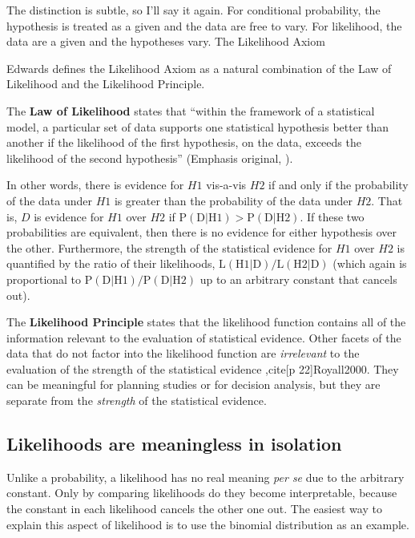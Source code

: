 The distinction is subtle, so I'll say it again. For conditional probability, the hypothesis is treated as a given and the data are free to vary. For likelihood, the data are a given and the hypotheses vary.
The Likelihood Axiom

Edwards \cite[p 30]{Edwards1992} defines the Likelihood Axiom as a natural combination of the Law of Likelihood and the Likelihood Principle.

The \textbf{Law of Likelihood} states that ``within the framework of a statistical model, a particular set of data supports one statistical hypothesis better than another if the likelihood of the first hypothesis, on the data, exceeds the likelihood of the second hypothesis'' (Emphasis original, \cite[p 30]{Edwards1992}).

In other words, there is evidence for $H1$ vis-a-vis $H2$ if and only if the probability of the data under $H1$ is greater than the probability of the data under $H2$. That is, $D$ is evidence for $H1$ over $H2$ if $\mathrm{P}(\mathrm{D} | \mathrm{H} 1)>\mathrm{P}(\mathrm{D} | \mathrm{H} 2)$. If these two probabilities are equivalent, then there is no evidence for either hypothesis over the other. Furthermore, the strength of the statistical evidence for $H1$ over $H2$ is quantified by the ratio of their likelihoods, $\mathrm{L}(\mathrm{H} 1 | \mathrm{D}) / \mathrm{L}(\mathrm{H} 2 | \mathrm{D})$ (which again is proportional to $\mathrm{P}(\mathrm{D} | \mathrm{H} 1) / \mathrm{P}(\mathrm{D} | \mathrm{H} 2)$ up to an arbitrary constant that cancels out).

The \textbf{Likelihood Principle} states that the likelihood function contains all of the information relevant to the evaluation of statistical evidence. Other facets of the data that do not factor into the likelihood function are \textit{irrelevant} to the evaluation of the strength of the statistical evidence 
\cite[p 30]{Edwards1992},cite[p 22]{Royall2000}. They can be meaningful for planning studies or for decision analysis, but they are separate from the 
\textit{strength} of the statistical evidence.

\subsection{Likelihoods are meaningless in isolation}

Unlike a probability, a likelihood has no real meaning \textit{per se} due to the arbitrary constant. Only by comparing likelihoods do they become interpretable, because the constant in each likelihood cancels the other one out. The easiest way to explain this aspect of likelihood is to use the binomial distribution as an example.

